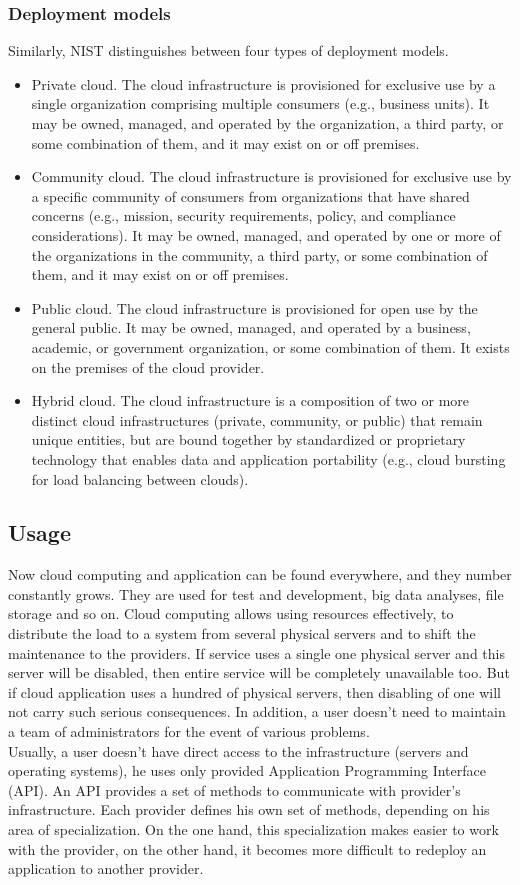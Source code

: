 \subsubsection*{Deployment models}
Similarly, NIST distinguishes between four types of deployment models.
\begin{itemize}
	\item Private cloud. 
	The cloud infrastructure is provisioned for exclusive use by a single organization comprising multiple consumers (e.g., business units). It may be owned, managed, and operated by the organization, a third party, or some combination of them, and it may exist on or off premises.
\item Community cloud.
	The cloud infrastructure is provisioned for exclusive use by a specific community of consumers from organizations that have shared concerns (e.g., mission, security requirements, policy, and compliance considerations).
	It may be owned, managed, and operated by one or more of the organizations in the community, a third party, or some combination of them, and it may exist on or off premises.
\item Public cloud.
	The cloud infrastructure is provisioned for open use by the general public. 
	It may be owned, managed, and operated by a business, academic, or government organization, or some combination of them.
	It exists on the premises of the cloud provider.
\item Hybrid cloud. 
	The cloud infrastructure is a composition of two or more distinct cloud infrastructures (private, community, or public) that remain unique entities, but are bound together by standardized or proprietary technology that enables data and application portability (e.g., cloud bursting for load balancing between clouds). 
\end{itemize}

\subsection{Usage}
Now cloud computing and application can be found everywhere, and they number constantly grows. \cite*{cloud_stat}
They are used for test and development, big data analyses, file storage and so on.
Cloud computing allows using resources effectively, to distribute the load to a system from several physical servers and to shift the maintenance to the providers. 
If service uses a single one physical server and this server will be disabled, then entire service will be completely unavailable too.
But if cloud application uses a hundred of physical servers, then disabling of one will not carry such serious consequences.
In addition, a user doesn't need to maintain a team of administrators for the event of various problems.\\
Usually, a user doesn't have direct access to the infrastructure (servers and operating systems), he uses only provided Application Programming Interface (API).
An API provides a set of methods to communicate with provider's infrastructure. 
Each provider defines his own set of methods, depending on his area of specialization. 
On the one hand, this specialization makes easier to work with the provider, on the other hand, it becomes more difficult to redeploy an application to another provider.

